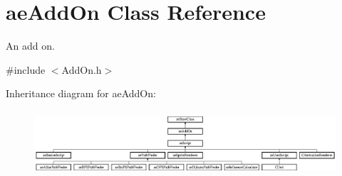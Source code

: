 \hypertarget{classae_add_on}{}\section{ae\+Add\+On Class Reference}
\label{classae_add_on}


An add on.  




{\ttfamily \#include $<$Add\+On.\+h$>$}

Inheritance diagram for ae\+Add\+On\+:\begin{figure}[H]
\begin{center}
\leavevmode
\includegraphics[height=2.430556cm]{classae_add_on}
\end{center}
\end{figure}
